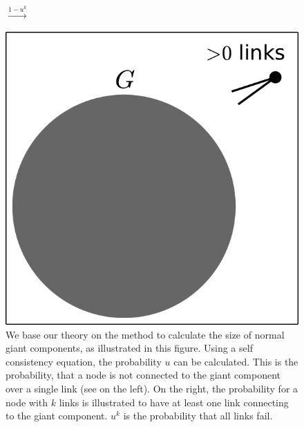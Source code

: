 \documentclass[aps, pre, onecolumn, a4paper, floatfix]{revtex4}
\begin{document}
\begin{figure}[htb]
\begin{minipage}[b]{0.18\linewidth}
\begin{center}
    \end{center}
  \end{minipage}
  \begin{minipage}[b]{0.07\linewidth}
    \begin{center}
      {\Large $\xrightarrow{1-u^k}$}\\
      \vspace{15mm}
    \end{center}
  \end{minipage}
  \begin{minipage}[b]{0.18\linewidth}
    \begin{center}
      \includegraphics[width=0.99\columnwidth]{sets_gc_gck.pdf}
    \end{center}
  \end{minipage}
    \caption{We base our theory on the method to calculate the size of 
    normal giant components, as illustrated in this figure. Using a self 
    consistency equation, the probability $u$ can be calculated. This is the 
    probability, that a node is not connected to the giant component over a 
    single link (see on the left). On the right, the probability for a node 
    with $k$ links is illustrated to have at least one link connecting to 
    the giant component. $u^k$ is the probability that all links fail.}
    \label{fig:1}
\end{figure}
\end{document}

